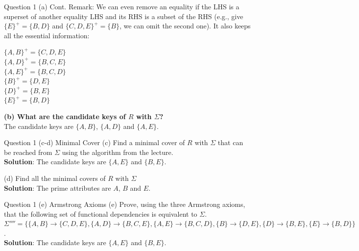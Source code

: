 \begin{frame}[fragile]{Question 1 (a) Cont.}
	Remark: We can even remove an equality if the LHS is a superset of another equality LHS and its RHS is a subset of the RHS (e.g., give $\{E\}^{+}= \{B, D\}$ and $\{C, D, E\}^{+}= \{B\}$, we can omit the second one). It also keeps all the essential information:\\\vspace{6pt}

	$\{A, B\}^{+}= \{C, D, E\}$\\
		$\{A, D\}^{+}= \{B, C, E\}$\\
		$\{A, E\}^{+}= \{B, C, D\}$\\
		$\{B\}^{+}= \{D, E\}$\\
		$\{D\}^{+}= \{B, E\}$\\
		$\{E\}^{+}= \{B, D\}$\\ \vspace{7pt}
	
	\textbf{(b) What are the candidate keys of $R$ with $\Sigma$?}\\\vspace{3pt}
	The candidate keys are $\{A,B\}$, $\{A,D\}$ and $\{A,E\}$.\\
\end{frame}

\begin{frame}[fragile]{Question 1 (c-d) Minimal Cover}
	(c) Find a minimal cover of $R$ with $\Sigma$ that can be reached from $\Sigma$ using the algorithm from the lecture.\\ \vspace{5pt}
	\textbf{Solution}: The candidate keys are $\{A, E\}$ and $\{B, E\}$. \\\vspace{35pt}

	(d) Find all the minimal covers of $R$ with $\Sigma$\\ \vspace{5pt}
	\textbf{Solution}: The prime attributes are $A$, $B$ and $E$.
\end{frame}

\begin{frame}[fragile]{Question 1 (e) Armstrong Axioms}
	(e) Prove, using the three Armstrong axioms, that the following set of functional dependencies is equivalent to $\Sigma$. \\\vspace{5pt}
	$\Sigma''''=\{\{A, B\} \rightarrow \{C, D, E\}, \{A, D\} \rightarrow \{B, C, E\}, \{A, E\} \rightarrow \{B, C, D\}, \{B\} \rightarrow \{D, E\}, \{D\} \rightarrow \{B, E\}, \{E\} \rightarrow \{B, D\}\}$.\\\vspace{5pt}
	 \vspace{5pt}
	\textbf{Solution}: The candidate keys are $\{A, E\}$ and $\{B, E\}$. \\\vspace{35pt}
	
\end{frame}

